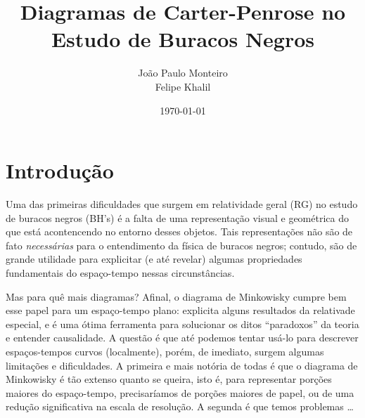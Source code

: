 \documentclass[12pt, a4paper]{article}
\begin{document}
\title{Diagramas de Carter-Penrose no Estudo de Buracos Negros}

\author{João Paulo Monteiro\\ Felipe Khalil}

\date{\today}

\maketitle
\tableofcontents

\newpage %


\section{Introdução}

Uma das primeiras dificuldades que surgem em relatividade geral (RG) no estudo de buracos negros (BH's)
é a falta de uma representação visual e geométrica do que está acontencendo no entorno
desses objetos. Tais representações não são de fato \textit{necessárias} para o 
entendimento da física de buracos negros; contudo, são de grande utilidade para explicitar
(e até revelar) algumas propriedades fundamentais do espaço-tempo nessas circunstâncias.

Mas para quê mais diagramas? Afinal, o diagrama de Minkowisky cumpre bem esse papel para um espaço-tempo plano:
explicita alguns resultados da relativade especial, e é uma ótima ferramenta
para solucionar os ditos \enquote{paradoxos} da teoria e entender causalidade. A questão é que até podemos tentar usá-lo para descrever espaços-tempos
curvos (localmente), porém, de imediato, surgem algumas limitações e dificuldades. A primeira e mais
notória de todas é que o diagrama de Minkowisky é tão extenso  quanto se queira, isto é, para representar
porções maiores do espaço-tempo, precisaríamos de porções maiores de papel, ou de uma redução
significativa na escala de resolução. A segunda é que temos problemas \dots 





\newpage
\printbibliography[title={Referências}]
\end{document}
